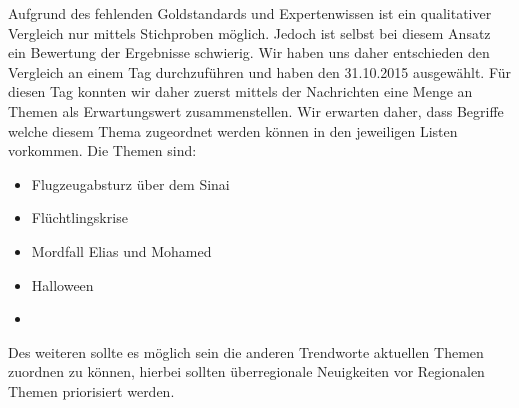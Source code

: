 Aufgrund des fehlenden Goldstandards und Expertenwissen ist ein qualitativer Vergleich nur mittels Stichproben möglich. Jedoch ist selbst bei diesem Ansatz ein Bewertung der Ergebnisse schwierig. Wir haben uns daher entschieden den Vergleich an einem Tag durchzuführen und haben den 31.10.2015 ausgewählt. 
Für diesen Tag konnten wir daher zuerst mittels der Nachrichten eine Menge an Themen als Erwartungswert zusammenstellen. Wir erwarten daher, dass Begriffe welche diesem Thema zugeordnet werden können in den jeweiligen Listen vorkommen. Die Themen sind:
\begin{itemize}
	\item Flugzeugabsturz über dem Sinai
	\item Flüchtlingskrise
	\item Mordfall Elias und Mohamed
	\item Halloween
	\item 
\end{itemize} 
Des weiteren sollte es möglich sein die anderen Trendworte aktuellen Themen zuordnen zu können, hierbei sollten überregionale Neuigkeiten vor Regionalen Themen priorisiert werden. 

